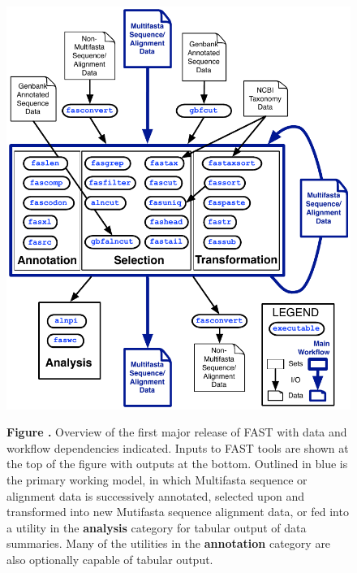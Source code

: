 \documentclass{frontiersSCNS} %
\begin{document}
\begin{figure}
\begin{center}
\includegraphics[width=4.5in]{FAST_v8}%
\end{center}
\textbf{\label{fig:01} Figure
  .}{ Overview of the first major release of FAST with
  data and workflow dependencies indicated.  Inputs to FAST tools are
  shown at the top of the figure with outputs at the bottom.  Outlined
  in blue is the primary working model, in which Multifasta sequence
  or alignment data is successively annotated, selected upon and
  transformed into new Mutifasta sequence alignment data, or fed into
  a utility in the {\bf analysis} category for tabular output of data
  summaries. Many of the utilities in the {\bf annotation} category
  are also optionally capable of tabular output.}
\end{figure}
\end{document}
